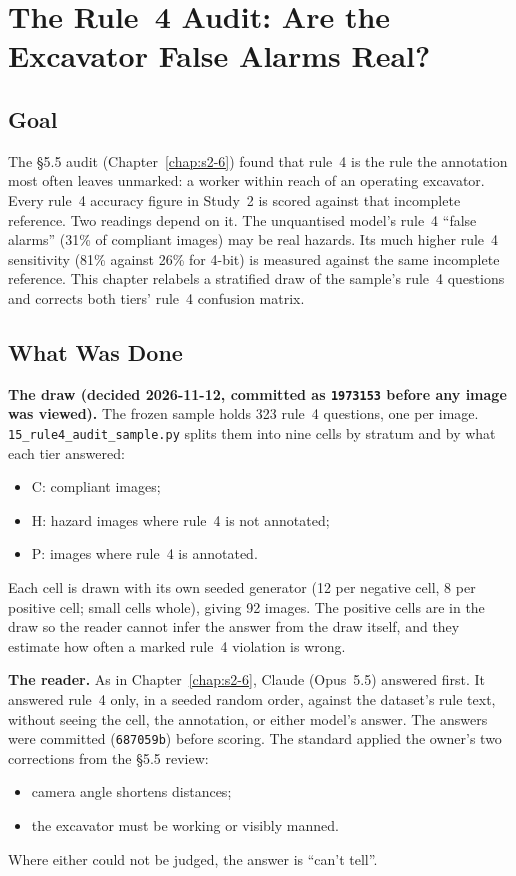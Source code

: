 \chapter{The Rule~4 Audit: Are the Excavator False Alarms Real?}
\label{chap:s2-7}

\section{Goal}

The \S5.5 audit (Chapter~\ref{chap:s2-6}) found that rule~4 is the rule the annotation most often leaves
unmarked: a worker within reach of an operating excavator. Every rule~4 accuracy figure in Study~2 is
scored against that incomplete reference. Two readings depend on it. The unquantised model's rule~4
``false alarms'' (31\% of compliant images) may be real hazards. Its much higher rule~4 sensitivity (81\%
against 26\% for 4-bit) is measured against the same incomplete reference. This chapter relabels a
stratified draw of the sample's rule~4 questions and corrects both tiers' rule~4 confusion matrix.

\section{What Was Done}

\textbf{The draw (decided 2026-11-12, committed as \texttt{1973153} before any image was viewed).} The
frozen sample holds 323 rule~4 questions, one per image. \texttt{15\_rule4\_audit\_sample.py} splits them
into nine cells by stratum and by what each tier answered:
\begin{itemize}
\item C: compliant images;
\item H: hazard images where rule~4 is not annotated;
\item P: images where rule~4 is annotated.
\end{itemize}
Each cell is drawn with its own seeded generator (12 per negative cell, 8 per positive cell; small cells
whole), giving 92 images. The positive cells are in the draw so the reader cannot infer the answer from
the draw itself, and they estimate how often a marked rule~4 violation is wrong.

\textbf{The reader.} As in Chapter~\ref{chap:s2-6}, Claude (Opus~5.5) answered first. It answered rule~4
only, in a seeded random order, against the dataset's rule text, without seeing the cell, the annotation,
or either model's answer. The answers were committed (\texttt{687059b}) before scoring. The standard
applied the owner's two corrections from the \S5.5 review:
\begin{itemize}
\item camera angle shortens distances;
\item the excavator must be working or visibly manned.
\end{itemize}
Where either could not be judged, the answer is ``can't tell''.

